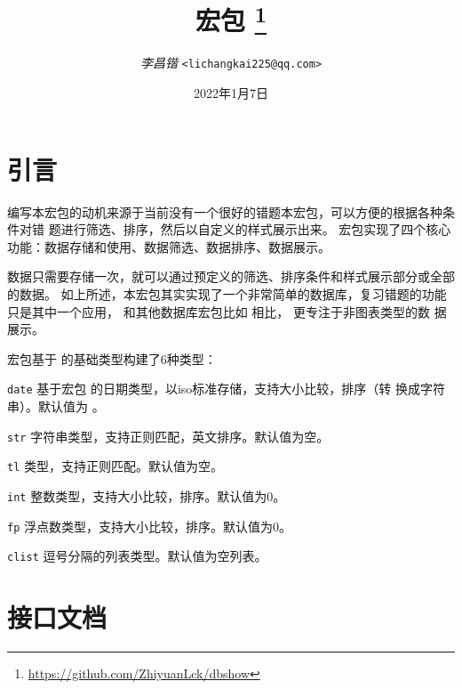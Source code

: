 \documentclass[full]{l3doc}
\begin{document}
\title{
   宏包
  \protect\footnote{\url{https://github.com/ZhiyuanLck/dbshow}}
}
\author{\textit{李昌锴} \texttt{<lichangkai225@qq.com>}}
\date{2022年1月7日}
\maketitle

\tableofcontents

\begin{documentation}

\section{引言}
编写本宏包的动机来源于当前没有一个很好的错题本宏包，可以方便的根据各种条件对错
题进行筛选、排序，然后以自定义的样式展示出来。 宏包实现了四个核心
功能：数据存储和使用、数据筛选、数据排序、数据展示。

数据只需要存储一次，就可以通过预定义的筛选、排序条件和样式展示部分或全部的数据。
如上所述，本宏包其实实现了一个非常简单的数据库，复习错题的功能只是其中一个应用，
和其他数据库宏包比如  相比， 更专注于非图表类型的数
据展示。

宏包基于  的基础类型构建了6种类型：
\begin{Description}
  \item[\texttt{date}]
    基于宏包  的日期类型，以iso标准存储，支持大小比较，排序（转
    换成字符串）。默认值为 。
  \item[\texttt{str}]
    字符串类型，支持正则匹配，英文排序。默认值为空。
  \item[\texttt{tl}]
    类型，支持正则匹配。默认值为空。
  \item[\texttt{int}]
    整数类型，支持大小比较，排序。默认值为0。
  \item[\texttt{fp}]
    浮点数类型，支持大小比较，排序。默认值为0。
  \item[\texttt{clist}]
    逗号分隔的列表类型。默认值为空列表。
\end{Description}

\section{接口文档}

\end{documentation}
\end{document}
